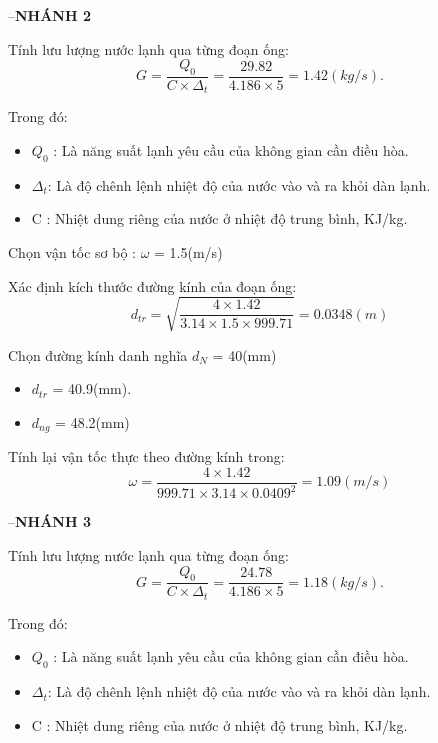 \newpage

--\textbf{NHÁNH 2}

Tính lưu lượng nước lạnh qua từng đoạn ống:
\begin{equation*}
	G = \dfrac{Q_{0}}{C \times \Delta_{t}} =\dfrac{29.82}{4.186 \times 5} = 1.42(kg/s).
\end{equation*}

Trong đó:
\begin{itemize}
	\item $Q_{0}$ : Là năng suất lạnh yêu cầu của không gian cần điều hòa.
	\item $\Delta_{t}$: Là độ chênh lệnh nhiệt độ của nước vào và ra khỏi dàn lạnh.
	\item C : Nhiệt dung riêng của nước ở nhiệt độ trung bình, KJ/kg.
\end{itemize}

Chọn vận tốc sơ bộ : $\omega$ = 1.5(m/s)

Xác định kích thước đường kính của đoạn ống:
\begin{equation*}
	d_{tr} = \sqrt{\dfrac{4 \times 1.42}{3.14 \times 1.5 \times 999.71}} = 0.0348(m)
\end{equation*}

Chọn đường kính danh nghĩa $d_{N}$ = 40(mm)
\begin{itemize}
	\item $d_{tr}$ = 40.9(mm).
	\item $d_{ng}$ = 48.2(mm)
\end{itemize}

Tính lại vận tốc thực theo đường kính trong:
\begin{equation*}
	\omega = \dfrac{4 \times 1.42 }{999.71 \times 3.14 \times 0.0409^{2}} = 1.09(m/s)
\end{equation*}

--\textbf{NHÁNH 3}

Tính lưu lượng nước lạnh qua từng đoạn ống:
\begin{equation*}
	G = \dfrac{Q_{0}}{C \times \Delta_{t}} =\dfrac{24.78}{4.186 \times 5} = 1.18(kg/s).
\end{equation*}

Trong đó:
\begin{itemize}
	\item $Q_{0}$ : Là năng suất lạnh yêu cầu của không gian cần điều hòa.
	\item $\Delta_{t}$: Là độ chênh lệnh nhiệt độ của nước vào và ra khỏi dàn lạnh.
	\item C : Nhiệt dung riêng của nước ở nhiệt độ trung bình, KJ/kg.
\end{itemize}

